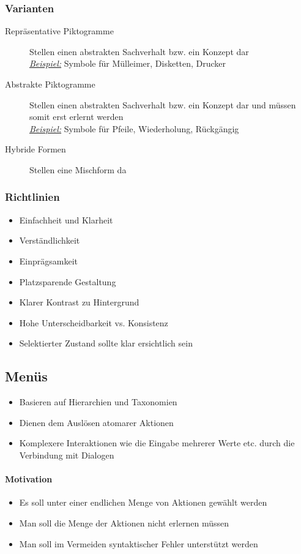 \documentclass
[
	8pt,		%
	ngerman,	%
	a4paper,	%
	landscape,	%
	final		%
]{extarticle}
\newcommand{\example}{\textit{\underline{Beispiel:} }}
\begin{document}
\begin{multicols*}{4}
	\subsubsection{Varianten}
	\begin{description}
		\item[Repräsentative Piktogramme] Stellen einen abstrakten Sachverhalt
		      bzw. ein Konzept dar \\
		      \example Symbole für Mülleimer, Disketten, Drucker
		\item[Abstrakte Piktogramme] Stellen einen abstrakten Sachverhalt bzw.
		      ein Konzept dar und müssen somit erst erlernt werden \\
		      \example Symbole für Pfeile, Wiederholung, Rückgängig
		\item[ Hybride Formen] Stellen eine Mischform da
	\end{description}
	\subsubsection{Richtlinien}
	\begin{itemize}
		\item Einfachheit und Klarheit
		\item Verständlichkeit
		\item Einprägsamkeit
		\item Platzsparende Gestaltung
		\item Klarer Kontrast zu Hintergrund
		\item Hohe Unterscheidbarkeit vs. Konsistenz
		\item Selektierter Zustand sollte klar ersichtlich sein
	\end{itemize}
	\subsection{Menüs}
	\begin{itemize}
		\item Basieren auf Hierarchien und Taxonomien
		\item Dienen dem Auslösen atomarer Aktionen
		\item Komplexere Interaktionen wie die Eingabe mehrerer Werte etc.
		      durch die Verbindung mit Dialogen
	\end{itemize}
	\paragraph{Motivation}
	\begin{itemize}
		\item Es soll unter einer endlichen Menge von Aktionen gewählt werden
		\item Man soll die Menge der Aktionen nicht erlernen müssen
		\item Man soll im Vermeiden syntaktischer Fehler unterstützt werden
	\end{itemize}

\end{multicols*}
\end{document}
